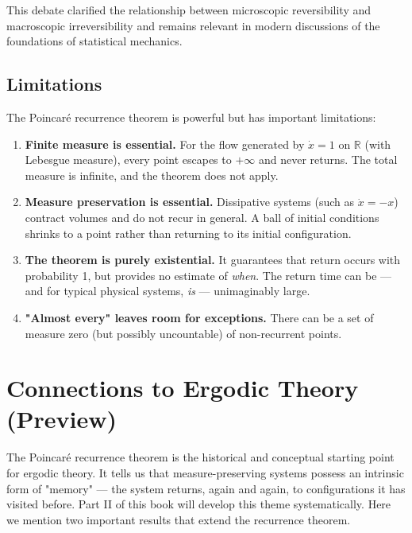 This debate clarified the relationship between microscopic reversibility and macroscopic irreversibility and remains relevant in modern discussions of the foundations of statistical mechanics.

\subsection{Limitations}\label{sec:4.4.5}

The Poincaré recurrence theorem is powerful but has important limitations:

\begin{enumerate}[nosep]
  \item \textbf{Finite measure is essential.} For the flow generated by $\dot{x} = 1$ on $\mathbb{R}$ (with Lebesgue measure), every point escapes to $+\infty$ and never returns. The total measure is infinite, and the theorem does not apply.

  \item \textbf{Measure preservation is essential.} Dissipative systems (such as $\dot{x} = -x$) contract volumes and do not recur in general. A ball of initial conditions shrinks to a point rather than returning to its initial configuration.

  \item \textbf{The theorem is purely existential.} It guarantees that return occurs with probability 1, but provides no estimate of \textit{when}. The return time can be --- and for typical physical systems, \textit{is} --- unimaginably large.

  \item \textbf{"Almost every" leaves room for exceptions.} There can be a set of measure zero (but possibly uncountable) of non-recurrent points.
\end{enumerate}


\section{Connections to Ergodic Theory (Preview)}\label{sec:4.5}

The Poincaré recurrence theorem is the historical and conceptual starting point for ergodic theory. It tells us that measure-preserving systems possess an intrinsic form of "memory" --- the system returns, again and again, to configurations it has visited before. Part II of this book will develop this theme systematically. Here we mention two important results that extend the recurrence theorem.

